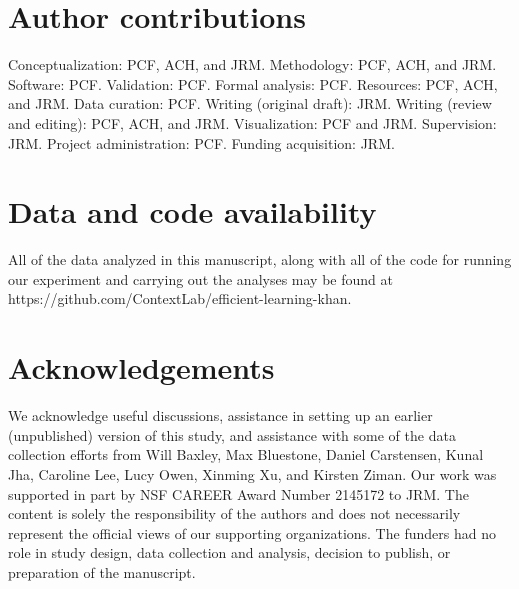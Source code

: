 \documentclass[10pt]{article}
\begin{document}
\section*{Author contributions}

Conceptualization: PCF, ACH, and JRM. Methodology: PCF, ACH, and JRM. Software:
PCF. Validation: PCF. Formal analysis: PCF. Resources: PCF, ACH, and JRM. Data
curation: PCF. Writing (original draft): JRM. Writing (review and editing):
PCF, ACH, and JRM. Visualization: PCF and JRM. Supervision: JRM. Project
administration: PCF. Funding acquisition: JRM.


\section*{Data and code availability}

All of the data analyzed in this manuscript, along with all of the code for
running our experiment and carrying out the analyses may be found at
https://github.com/Con\-text\-Lab/eff\-ic\-ient-learn\-ing-khan.

\section*{Acknowledgements}

We acknowledge useful discussions, assistance in setting up an earlier
(unpublished) version of this study, and assistance with some of the data
collection efforts from Will Baxley, Max Bluestone, Daniel Carstensen, Kunal
Jha, Caroline Lee, Lucy Owen, Xinming Xu, and Kirsten Ziman. Our work was
supported in part by NSF CAREER Award Number 2145172 to JRM. The content is
solely the responsibility of the authors and does not necessarily represent the
official views of our supporting organizations. The funders had no role in
study design, data collection and analysis, decision to publish, or preparation
of the manuscript.





\end{document}

